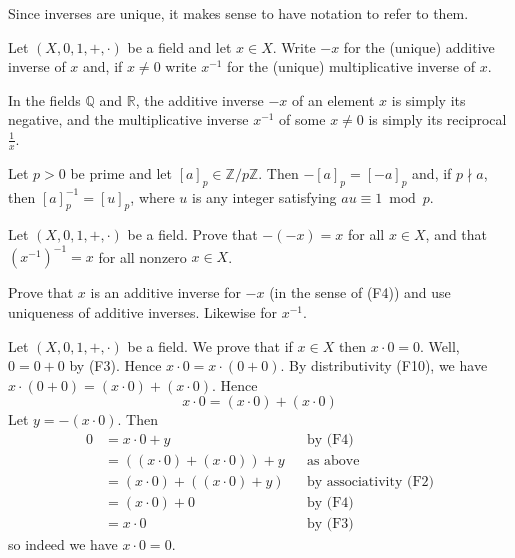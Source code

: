 Since inverses are unique, it makes sense to have notation to refer to them.

\begin{notation}
Let $(X,0,1,+,{\cdot})$ be a field and let $x \in X$. Write $-x$ for the (unique) additive inverse of $x$ and, if $x \ne 0$ write $x^{-1}$ for the (unique) multiplicative inverse of $x$.
\end{notation}

\begin{example}
\label{exQRAreFields}
In the fields $\mathbb{Q}$ and $\mathbb{R}$, the additive inverse $-x$ of an element $x$ is simply its negative, and the multiplicative inverse $x^{-1}$ of some $x \ne 0$ is simply its reciprocal $\frac{1}{x}$.
\end{example}

\begin{example}
Let $p>0$ be prime and let $[a]_p \in \mathbb{Z}/p\mathbb{Z}$. Then $-[a]_p=[-a]_p$ and, if $p \nmid a$, then $[a]_p^{-1} = [u]_p$, where $u$ is any integer satisfying $au \equiv 1 \bmod p$.
\end{example}

\begin{exercise}
\label{exInverseIsInvolution}
Let $(X, 0, 1, +, {\cdot})$ be a field. Prove that $-(-x)=x$ for all $x \in X$, and that $(x^{-1})^{-1} = x$ for all nonzero $x \in X$.
\begin{backhint}
Prove that $x$ is an additive inverse for $-x$ (in the sense of (F4)) and use uniqueness of additive inverses. Likewise for $x^{-1}$.
\end{backhint}
\end{exercise}

\begin{example}
Let $(X,0,1,+,{\cdot})$ be a field. We prove that if $x \in X$ then $x \cdot 0 = 0$. Well, $0=0+0$ by (F3). Hence $x \cdot 0 = x \cdot (0+0)$. By distributivity (F10), we have $x \cdot (0+0) = (x \cdot 0) + (x \cdot 0)$. Hence
\[ x \cdot 0 = (x \cdot 0) + (x \cdot 0) \]
Let $y=-(x \cdot 0)$. Then
\begin{align*}
0 &= x \cdot 0 + y && \text{by (F4)} \\
&= ((x \cdot 0) + (x \cdot 0)) + y && \text{as above} \\
&= (x \cdot 0) + ((x \cdot 0) + y) && \text{by associativity (F2)} \\
&= (x \cdot 0) + 0 && \text{by (F4)} \\
&= x \cdot 0 && \text{by (F3)}
\end{align*}
so indeed we have $x \cdot 0 = 0$.
\end{example}

